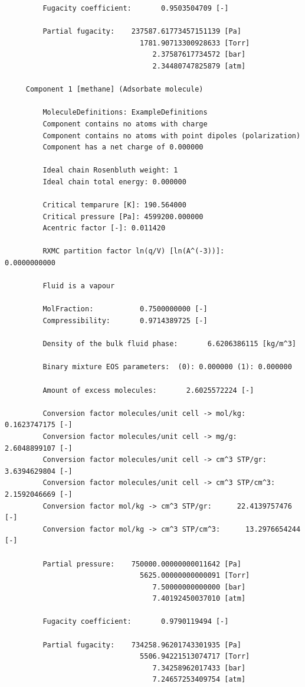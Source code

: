 \begin{tiny}
\begin{verbatim}
         Fugacity coefficient:       0.9503504709 [-]
     
         Partial fugacity:    237587.61773457151139 [Pa]
                                1781.90713300928633 [Torr]
                                   2.37587617734572 [bar]
                                   2.34480747825879 [atm]
     
     Component 1 [methane] (Adsorbate molecule)
     
         MoleculeDefinitions: ExampleDefinitions
         Component contains no atoms with charge
         Component contains no atoms with point dipoles (polarization)
         Component has a net charge of 0.000000
     
         Ideal chain Rosenbluth weight: 1
         Ideal chain total energy: 0.000000
     
         Critical temparure [K]: 190.564000
         Critical pressure [Pa]: 4599200.000000
         Acentric factor [-]: 0.011420
     
         RXMC partition factor ln(q/V) [ln(A^(-3))]:       0.0000000000
     
         Fluid is a vapour
     
         MolFraction:           0.7500000000 [-]
         Compressibility:       0.9714389725 [-]
     
         Density of the bulk fluid phase:       6.6206386115 [kg/m^3]
     
         Binary mixture EOS parameters:  (0): 0.000000 (1): 0.000000
     
         Amount of excess molecules:       2.6025572224 [-]
     
         Conversion factor molecules/unit cell -> mol/kg:       0.1623747175 [-]
         Conversion factor molecules/unit cell -> mg/g:       2.6048899107 [-]
         Conversion factor molecules/unit cell -> cm^3 STP/gr:       3.6394629804 [-]
         Conversion factor molecules/unit cell -> cm^3 STP/cm^3:       2.1592046669 [-]
         Conversion factor mol/kg -> cm^3 STP/gr:      22.4139757476 [-]
         Conversion factor mol/kg -> cm^3 STP/cm^3:      13.2976654244 [-]
     
         Partial pressure:    750000.00000000011642 [Pa]
                                5625.00000000000091 [Torr]
                                   7.50000000000000 [bar]
                                   7.40192450037010 [atm]
     
         Fugacity coefficient:       0.9790119494 [-]
     
         Partial fugacity:    734258.96201743301935 [Pa]
                                5506.94221513074717 [Torr]
                                   7.34258962017433 [bar]
                                   7.24657253409754 [atm]
\end{verbatim}
\end{tiny}
